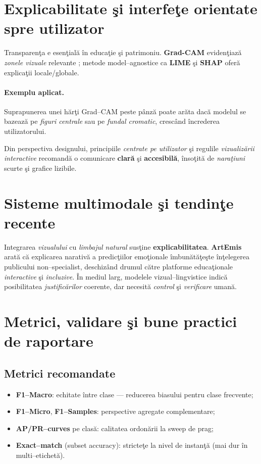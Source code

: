 \section{Explicabilitate şi interfeţe orientate spre utilizator}

Transparenţa e esenţială în educaţie şi patrimoniu. \textbf{Grad-CAM} evidenţiază \emph{zonele vizuale} relevante \cite{selvaraju2017grad}; metode model–agnostice ca \textbf{LIME} \cite{ribeiro2016should} şi \textbf{SHAP} \cite{lundberg2017unified} oferă explicaţii locale/globale.

\paragraph{Exemplu aplicat.} Suprapunerea unei hărţi Grad–CAM peste pânză poate arăta dacă modelul se bazează pe \emph{figuri centrale} sau pe \emph{fundal cromatic}, crescând încrederea utilizatorului.

Din perspectiva designului, principiile \emph{centrate pe utilizator} \cite{norman2013design} şi regulile \emph{vizualizării interactive} \cite{shneiderman2003eyes} recomandă o comunicare \textbf{clară} şi \textbf{accesibilă}, însoţită de \emph{naraţiuni} scurte şi grafice lizibile.

\section{Sisteme multimodale şi tendinţe recente}

Integrarea \emph{vizualului} cu \emph{limbajul natural} susţine \textbf{explicabilitatea}. \textbf{ArtEmis} \cite{achlioptas2021artemis} arată că explicarea narativă a predicţiilor emoţionale îmbunătăţeşte înţelegerea publicului non–specialist, deschizând drumul către platforme educaţionale \emph{interactive} şi \emph{incluzive}. În mediul larg, modelele vizual–lingvistice indică posibilitatea \emph{justificărilor} coerente, dar necesită \emph{control} şi \emph{verificare} umană.

\section{Metrici, validare şi bune practici de raportare}

\subsection{Metrici recomandate}

\begin{itemize}[leftmargin=*, itemsep=2pt, topsep=2pt]
  \item \textbf{F1–Macro}: echitate între clase — reducerea biasului pentru clase frecvente;
  \item \textbf{F1–Micro}, \textbf{F1–Samples}: perspective agregate complementare;
  \item \textbf{AP/PR–curves} pe clasă: calitatea ordonării la sweep de prag;
  \item \textbf{Exact–match} (subset accuracy): stricteţe la nivel de instanţă (mai dur în multi–etichetă).
\end{itemize}

